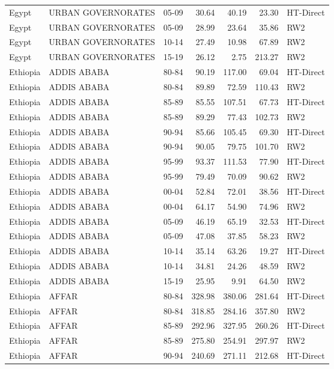 \begin{longtable}{lllrrrl}
  Egypt & URBAN GOVERNORATES & 05-09 & 30.64 & 40.19 & 23.30 & HT-Direct \\ 
  Egypt & URBAN GOVERNORATES & 05-09 & 28.99 & 23.64 & 35.86 & RW2 \\ 
  Egypt & URBAN GOVERNORATES & 10-14 & 27.49 & 10.98 & 67.89 & RW2 \\ 
  Egypt & URBAN GOVERNORATES & 15-19 & 26.12 & 2.75 & 213.27 & RW2 \\ 
  Ethiopia & ADDIS ABABA & 80-84 & 90.19 & 117.00 & 69.04 & HT-Direct \\ 
  Ethiopia & ADDIS ABABA & 80-84 & 89.89 & 72.59 & 110.43 & RW2 \\ 
  Ethiopia & ADDIS ABABA & 85-89 & 85.55 & 107.51 & 67.73 & HT-Direct \\ 
  Ethiopia & ADDIS ABABA & 85-89 & 89.29 & 77.43 & 102.73 & RW2 \\ 
  Ethiopia & ADDIS ABABA & 90-94 & 85.66 & 105.45 & 69.30 & HT-Direct \\ 
  Ethiopia & ADDIS ABABA & 90-94 & 90.05 & 79.75 & 101.70 & RW2 \\ 
  Ethiopia & ADDIS ABABA & 95-99 & 93.37 & 111.53 & 77.90 & HT-Direct \\ 
  Ethiopia & ADDIS ABABA & 95-99 & 79.49 & 70.09 & 90.62 & RW2 \\ 
  Ethiopia & ADDIS ABABA & 00-04 & 52.84 & 72.01 & 38.56 & HT-Direct \\ 
  Ethiopia & ADDIS ABABA & 00-04 & 64.17 & 54.90 & 74.96 & RW2 \\ 
  Ethiopia & ADDIS ABABA & 05-09 & 46.19 & 65.19 & 32.53 & HT-Direct \\ 
  Ethiopia & ADDIS ABABA & 05-09 & 47.08 & 37.85 & 58.23 & RW2 \\ 
  Ethiopia & ADDIS ABABA & 10-14 & 35.14 & 63.26 & 19.27 & HT-Direct \\ 
  Ethiopia & ADDIS ABABA & 10-14 & 34.81 & 24.26 & 48.59 & RW2 \\ 
  Ethiopia & ADDIS ABABA & 15-19 & 25.95 & 9.91 & 64.50 & RW2 \\ 
  Ethiopia & AFFAR & 80-84 & 328.98 & 380.06 & 281.64 & HT-Direct \\ 
  Ethiopia & AFFAR & 80-84 & 318.85 & 284.16 & 357.80 & RW2 \\ 
  Ethiopia & AFFAR & 85-89 & 292.96 & 327.95 & 260.26 & HT-Direct \\ 
  Ethiopia & AFFAR & 85-89 & 275.80 & 254.91 & 297.97 & RW2 \\ 
  Ethiopia & AFFAR & 90-94 & 240.69 & 271.11 & 212.68 & HT-Direct \\ 

\end{longtable}
